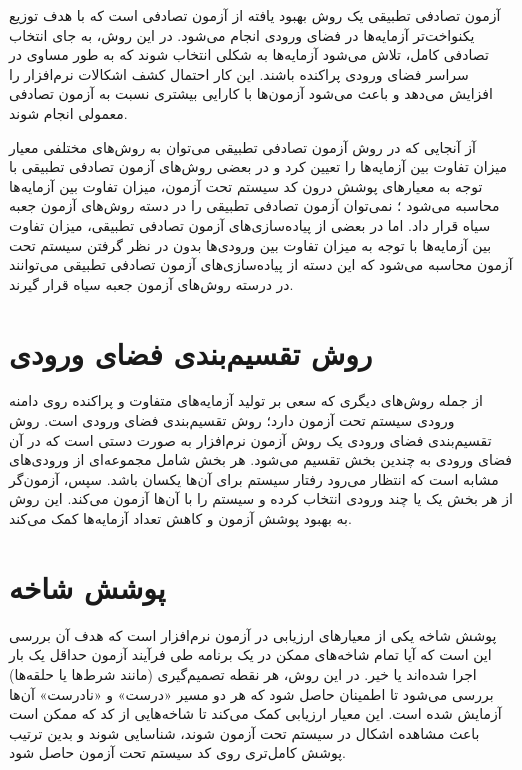 آزمون تصادفی تطبیقی
\cite{chen2005adaptive}
 یک روش بهبود یافته از آزمون تصادفی است که با هدف توزیع یکنواخت‌تر آزمایه‌ها در فضای ورودی انجام می‌شود. در این روش، به جای انتخاب تصادفی کامل، تلاش می‌شود آزمایه‌ها به شکلی انتخاب شوند که به طور مساوی در سراسر فضای ورودی پراکنده باشند. این کار احتمال کشف اشکالات نرم‌افزار را افزایش می‌دهد و باعث می‌شود آزمون‌ها با کارایی بیشتری نسبت به آزمون تصادفی معمولی انجام شوند.

آز آنجایی که در روش آزمون تصادفی تطبیقی می‌توان به روش‌های مختلفی معیار میزان تفاوت بین آزمایه‌ها را تعیین کرد و در بعضی روش‌های آزمون تصادفی تطبیقی با توجه به معیار‌های پوشش درون کد سیستم تحت آزمون، میزان تفاوت بین آزمایه‌ها محاسبه می‌شود
\cite{zhou2010using}\cite{chen2021novel}
؛ نمی‌توان آزمون تصادفی تطبیقی را در دسته روش‌های آزمون جعبه سیاه قرار داد. اما در بعضی از پیاده‌سازی‌های آزمون تصادفی تطبیقی، میزان تفاوت بین آزمایه‌ها با توجه به میزان تفاوت بین ورودی‌ها بدون در نظر گرفتن سیستم تحت آزمون محاسبه می‌شود
\cite{ciupa2008artoo}\cite{chen2007test}
 که این دسته از پیاده‌سازی‌های آزمون تصادفی تطبیقی می‌توانند در درسته روش‌های آزمون جعبه سیاه قرار گیرند.

\section{روش تقسیم‌بندی فضای ورودی}

از جمله روش‌های دیگری که سعی بر تولید آزمایه‌های متفاوت و پراکنده روی دامنه ورودی سیستم تحت آزمون دارد؛ روش تقسیم‌بندی فضای ورودی
\cite{vagoun1996input}
 است.
روش تقسیم‌بندی فضای ورودی یک روش آزمون نرم‌افزار به صورت دستی است که در آن فضای ورودی به چندین بخش تقسیم می‌شود. هر بخش شامل مجموعه‌ای از ورودی‌های مشابه است که انتظار می‌رود رفتار سیستم برای آن‌ها یکسان باشد. سپس، آزمون‌گر از هر بخش یک یا چند ورودی انتخاب کرده و سیستم را با آن‌ها آزمون می‌کند. این روش به بهبود پوشش آزمون و کاهش تعداد آزمایه‌ها کمک می‌کند.

\section{پوشش شاخه}

پوشش شاخه‌
\cite{wei2012branch}
 یکی از معیارهای ارزیابی در آزمون نرم‌افزار است که هدف آن بررسی این است که آیا تمام شاخه‌های ممکن در یک برنامه طی فرآیند آزمون حداقل یک بار اجرا شده‌اند یا خیر. در این روش، هر نقطه تصمیم‌گیری (مانند شرط‌ها یا حلقه‌ها) بررسی می‌شود تا اطمینان حاصل شود که هر دو مسیر «درست» و «نادرست» آن‌ها آزمایش شده است. این معیار ارزیابی کمک می‌کند تا شاخه‌هایی از کد که ممکن است باعث مشاهده اشکال در سیستم تحت آزمون شوند، شناسایی شوند و بدین ترتیب پوشش کامل‌تری روی کد سیستم تحت آزمون حاصل شود.

